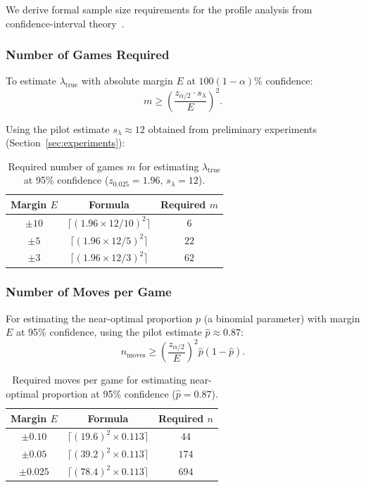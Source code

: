 \documentclass[11pt,a4paper]{article}
\begin{document}
We derive formal sample size requirements for the profile analysis from
confidence-interval theory~\citep{montgomery2010applied}.

\subsubsection{Number of Games Required}

To estimate $\lambda_{\text{true}}$ with absolute margin $E$ at
$100(1-\alpha)\%$ confidence:
\begin{equation}
    m \geq \left(\frac{z_{\alpha/2} \cdot s_\lambda}{E}\right)^2.
    \label{eq:n_games}
\end{equation}

Using the pilot estimate $s_\lambda \approx 12$ obtained from preliminary
experiments (Section~\ref{sec:experiments}):

\begin{table}[H]
\centering
\caption{Required number of games $m$ for estimating $\lambda_{\text{true}}$
at 95\% confidence ($z_{0.025} = 1.96$, $s_\lambda = 12$).}
\label{tab:n_games}
\begin{tabular}{ccc}
\toprule
Margin $E$ & Formula & Required $m$ \\
\midrule
$\pm 10$ & $\lceil(1.96 \times 12 / 10)^2\rceil$ & $6$ \\
$\pm 5$  & $\lceil(1.96 \times 12 / 5)^2\rceil$  & $22$ \\
$\pm 3$  & $\lceil(1.96 \times 12 / 3)^2\rceil$  & $62$ \\
\bottomrule
\end{tabular}
\end{table}

\subsubsection{Number of Moves per Game}

For estimating the near-optimal proportion $p$ (a binomial parameter) with
margin $E$ at 95\% confidence, using the pilot estimate $\hat{p} \approx 0.87$:
\begin{equation}
    n_{\text{moves}} \geq \left(\frac{z_{\alpha/2}}{E}\right)^2
    \hat{p}(1 - \hat{p}).
    \label{eq:n_moves}
\end{equation}

\begin{table}[H]
\centering
\caption{Required moves per game for estimating near-optimal proportion
at 95\% confidence ($\hat{p} = 0.87$).}
\label{tab:n_moves}
\begin{tabular}{ccc}
\toprule
Margin $E$ & Formula & Required $n$ \\
\midrule
$\pm 0.10$ & $\lceil(19.6)^2 \times 0.113\rceil$ & $44$ \\
$\pm 0.05$ & $\lceil(39.2)^2 \times 0.113\rceil$ & $174$ \\
$\pm 0.025$ & $\lceil(78.4)^2 \times 0.113\rceil$ & $694$ \\
\bottomrule
\end{tabular}
\end{table}
\end{document}
